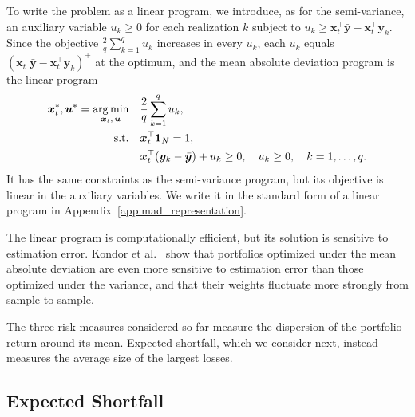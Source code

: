 To write the problem as a linear program, we introduce, as for the semi-variance, an auxiliary variable $u_k \ge 0$ for
each realization $k$ subject to $u_k \ge \bm{x}_t^\top \bar{\bm{y}} - \bm{x}_t^\top \bm{y}_k$.
Since the objective $\frac{2}{q} \sum_{k=1}^q u_k$ increases in every $u_k$, each $u_k$ equals
$(\bm{x}_t^\top \bar{\bm{y}} - \bm{x}_t^\top \bm{y}_k)^+$ at the optimum, and the mean absolute deviation program is the
linear program
\begin{equation*}
\begin{aligned}
    \bm{x}_t^*, \bm{u}^* = \operatorname*{arg\,min}_{\bm{x}_t,\, \bm{u}} \quad & \frac{2}{q} \sum_{k=1}^q u_k, \\
    \text{s.t.} \quad & \bm{x}_t^\top \bm{1}_N = 1, \\
    & \bm{x}_t^\top (\bm{y}_k - \bar{\bm{y}}) + u_k \ge 0, \quad u_k \ge 0, \quad k = 1, \dots, q.
\end{aligned}
\end{equation*}
It has the same constraints as the semi-variance program, but its objective is linear in the auxiliary variables. We write it in the standard form of a linear program in Appendix~\ref{app:mad_representation}.

The linear program is computationally efficient, but its solution is sensitive to estimation error. Kondor et
al.~\cite{kondor2007noise} show that portfolios optimized under the mean absolute deviation are even more sensitive to
estimation error than those optimized under the variance, and that their weights fluctuate more strongly from sample to
sample.

The three risk measures considered so far measure the dispersion of the portfolio return around its mean. Expected
shortfall, which we consider next, instead measures the average size of the largest losses.

\subsection{Expected Shortfall}\label{sec:risk-es}

